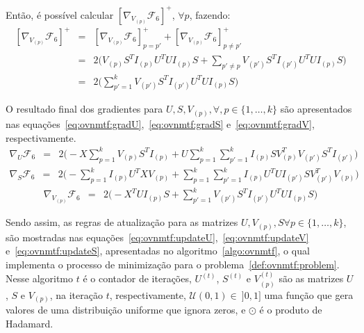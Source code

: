 \documentclass[
    12pt,                %
    oneside,            %
    a4paper,            %
    english,            %
    brazil                %
    ]{abntex2ppgsi}
\begin{document}
Então, é possível calcular $[\nabla_{V_{(p)}} \mathcal{F}_6]^{+}$, $\forall p$, fazendo:
\[
    \begin{array}{lcl}
        [\nabla_{V_{(p)}} \mathcal{F}_6]^{+} & = & [\nabla_{V_{(p)}} \mathcal{F}_6]^{+}_{p = p'} + [\nabla_{V_{(p)}} \mathcal{F}_6]^{+}_{p \neq p'} \\
                                             & = & 2 \big( V_{(p)} S^T I_{(p)} U^T U I_{(p)} S + \sum_{p' \neq p} V_{(p')} S^T I_{(p')} U^T U I_{(p)} S \big) \\
                                             & = & 2 \big( \sum_{p'=1}^{k} V_{(p')} S^T I_{(p')} U^T U I_{(p)} S \big)
    \end{array}
\]

O resultado final dos gradientes para $U, S, V_{(p)}, \forall, p \in \{1, \dots, k\}$ são apresentados nas equações~\ref{eq:ovnmtf:gradU},~\ref{eq:ovnmtf:gradS} e~\ref{eq:ovnmtf:gradV}, respectivamente.
\begin{equation}
\label{eq:ovnmtf:gradU}
    \begin{array}{lcl}
        \nabla_U \mathcal{F}_6 & = & 2 \big( - X \sum_{p=1}^{k} V_{(p)} S^T I_{(p)} + U \sum_{p=1}^k \sum_{p'=1}^{k} I_{(p)} S V_{(p)}^T V_{(p')} S^T I_{(p')} \big)
    \end{array}
\end{equation}
\begin{equation}
\label{eq:ovnmtf:gradS}
    \begin{array}{lcl}
        \nabla_S \mathcal{F}_6 & = & 2 \big( - \sum_{p=1}^{k} I_{(p)} U^T X V_{(p)} + \sum_{p=1}^{k} \sum_{p'=1}^{k} I_{(p)} U^T U I_{(p')} S V_{(p')}^T V_{(p)} \big)
    \end{array}
\end{equation}
\begin{equation}
\label{eq:ovnmtf:gradV}
    \begin{array}{lcl}
        \nabla_{V_{(p)}} \mathcal{F}_6 & = & 2 \big( -X^T U I_{(p)} S + \sum_{p'=1}^{k} V_{(p')} S^T I_{(p')} U^T U I_{(p)} S \big)
    \end{array}
\end{equation}

Sendo assim, as regras de atualização para as matrizes $U, V_{(p)}, S \forall p \in \{1, \dots, k\}$, são mostradas nas equações~\ref{eq:ovnmtf:updateU},~\ref{eq:ovnmtf:updateV} e~\ref{eq:ovnmtf:updateS}, apresentadas no algoritmo~\ref{algo:ovnmtf}, o qual implementa o processo de minimização para o problema~\ref{def:ovnmtf:problem}.
Nesse algoritmo $t$ é o contador de iterações, $U^{(t)}$, $S^{(t)}$ e $V_{(p)}^{(t)}$ são as matrizes $U$, $S$ e $V_{(p)}$, na iteração $t$, respectivamente, $\mathcal{U}(0, 1) \in~]0, 1]$ uma função que gera valores de uma distribuição uniforme que ignora zeros, e $\odot$ é o produto de Hadamard.
\end{document}

